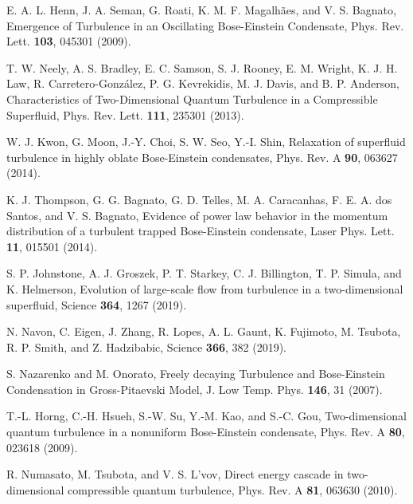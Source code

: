 \documentclass[12pt,a4paper]{jbook}
\begin{document}
\begin{thebibliography}{99}
        E. A. L. Henn, J. A. Seman, G. Roati, K. M. F. Magalh\~aes, and V. S. Bagnato,
        Emergence of Turbulence in an Oscillating Bose-Einstein Condensate,  
        Phys. Rev. Lett. \textbf{103}, 045301 (2009).
        
        T. W. Neely, A. S. Bradley, E. C. Samson, S. J. Rooney, E. M. Wright,
        K. J. H. Law, R. Carretero-Gonz\'alez, P. G. Kevrekidis, M. J. Davis, and
        B. P. Anderson,
        Characteristics of Two-Dimensional Quantum Turbulence in a Compressible
        Superfluid,
        Phys. Rev. Lett. \textbf{111}, 235301 (2013).
        
        W. J. Kwon, G. Moon, J.-Y. Choi, S. W. Seo, Y.-I. Shin,
        Relaxation of superfluid turbulence in highly oblate Bose-Einstein
        condensates,  
        Phys. Rev. A \textbf{90}, 063627 (2014).

        K. J. Thompson, G. G. Bagnato, G. D. Telles, M. A. Caracanhas, F. E. A. dos
        Santos, and V. S. Bagnato,
        Evidence of power law behavior in the momentum distribution of a turbulent
        trapped Bose-Einstein condensate,
        Laser Phys. Lett. \textbf{11}, 015501 (2014).
        
        S. P. Johnstone, A. J. Groszek, P. T. Starkey, C. J. Billington,
        T. P. Simula, and K. Helmerson,
        Evolution of large-scale flow from turbulence in a two-dimensional
        superfluid,
        Science \textbf{364}, 1267 (2019).
        
        N. Navon, C. Eigen, J. Zhang, R. Lopes, A. L. Gaunt, K. Fujimoto,
        M. Tsubota, R. P. Smith, and Z. Hadzibabic,
        Science \textbf{366}, 382 (2019).
        
        S. Nazarenko and M. Onorato,
        Freely decaying Turbulence and Bose-Einstein Condensation in
        Gross-Pitaevski Model,
        J. Low Temp. Phys. \textbf{146}, 31 (2007).

        T.-L. Horng, C.-H. Hsueh, S.-W. Su, Y.-M. Kao, and S.-C. Gou,
        Two-dimensional quantum turbulence in a nonuniform Bose-Einstein condensate,
        Phys. Rev. A \textbf{80}, 023618 (2009).

        R. Numasato, M. Tsubota, and V. S. L'vov,
        Direct energy cascade in two-dimensional compressible quantum turbulence,
        Phys. Rev. A \textbf{81}, 063630 (2010).


\end{thebibliography}
\end{document}
